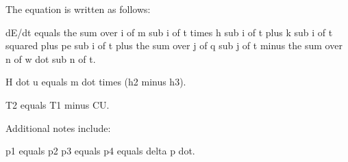 The equation is written as follows: 

dE/dt equals the sum over i of m sub i of t times h sub i of t plus k sub i of t squared plus pe sub i of t plus the sum over j of q sub j of t minus the sum over n of w dot sub n of t.

H dot u equals m dot times (h2 minus h3).

T2 equals T1 minus CU.

Additional notes include:

p1 equals p2
p3 equals p4 equals delta p dot.